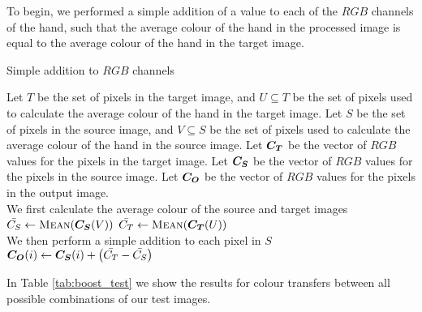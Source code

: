 To begin, we performed a simple addition of a value to each of the $RGB$ channels of the hand, such that the average colour of the hand in the processed image is equal to the average colour of the hand in the target image.

\begin{algorithm}[H]
\caption{Simple addition to $RGB$ channels}
\label{eq:boost_algo}
\begin{algorithmic}
\State Let $T$ be the set of pixels in the target image, and $U \subseteq T$ be the set of pixels used to calculate the average colour of the hand in the target image.
\State Let $S$ be the set of pixels in the source image, and $V \subseteq S$ be the set of pixels used to calculate the average colour of the hand in the source image.
\State Let $\boldsymbol{C_T}$ be the vector of $RGB$ values for the pixels in the target image.
\State Let $\boldsymbol{C_S}$ be the vector of $RGB$ values for the pixels in the source image.
\State Let $\boldsymbol{C_O}$ be the vector of $RGB$ values for the pixels in the output image.\\
\State We first calculate the average colour of the source and target images
\State $\mean{C_S} \gets \Call{Mean}{\vect{C_S}(V)}$
\State $\mean{C_T} \gets \Call{Mean}{\vect{C_T}(U)}$\\
\State We then perform a simple addition to each pixel in $S$
\State $\boldsymbol{C_O}(i) \gets \boldsymbol{C_S}(i) + \left(\bar{C_T} - \bar{C_S}\right)$
\EndFor
\end{algorithmic}
\end{algorithm}


In Table \ref{tab:boost_test} we show the results for colour transfers between all possible combinations of our test images.


